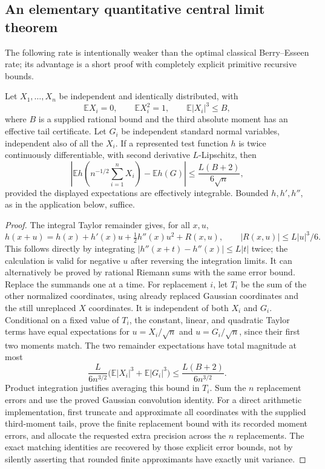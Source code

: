\subsection{An elementary quantitative central limit theorem}

The following rate is intentionally weaker than the optimal classical
Berry--Esseen rate; its advantage is a short proof with completely explicit
primitive recursive bounds.

Let $X_1,\ldots,X_n$ be independent and identically distributed, with
\[
 \mathbb E X_i=0,\qquad \mathbb E X_i^2=1,\qquad
 \mathbb E|X_i|^3\leq B,
\]
where $B$ is a supplied rational bound and the third absolute moment has
an effective tail certificate.  Let $G_i$ be independent standard normal
variables, independent also of all the $X_i$.  If a represented test
function $h$ is twice continuously differentiable, with second derivative
$L$-Lipschitz, then
\begin{equation}
 \left|\mathbb E h\!\left(n^{-1/2}\sum_{i=1}^nX_i\right)
               -\mathbb E h(G)\right|
 \leq\frac{L(B+2)}{6\sqrt n},
 \label{eq:smooth-clt}
\end{equation}
provided the displayed expectations are effectively integrable.  Bounded
$h,h',h''$, as in the application below, suffice.

\begin{proof}
The integral Taylor remainder gives, for all $x,u$,
\[
 h(x+u)=h(x)+h'(x)u+\tfrac12h''(x)u^2+R(x,u),\qquad
 |R(x,u)|\leq L|u|^3/6.
\]
This follows directly by integrating
$|h''(x+t)-h''(x)|\leq L|t|$ twice; the calculation is valid for negative
$u$ after reversing the integration limits.  It can alternatively be
proved by rational Riemann sums with the same error bound.
Replace the summands one at a time.  For replacement $i$, let $T_i$ be the
sum of the other normalized coordinates, using already replaced Gaussian
coordinates and the still unreplaced $X$ coordinates.  It is independent
of both $X_i$ and $G_i$.  Conditional on a fixed value of $T_i$, the constant,
linear, and quadratic Taylor terms have equal expectations for
$u=X_i/\sqrt n$ and $u=G_i/\sqrt n$, since their first two moments match.
The two remainder expectations have total magnitude at most
\[
 \frac{L}{6n^{3/2}}
      \bigl(\mathbb E|X_i|^3+\mathbb E|G_i|^3\bigr)
 \leq\frac{L(B+2)}{6n^{3/2}}.
\]
Product integration justifies averaging this bound in $T_i$.  Sum the $n$
replacement errors and use the proved Gaussian convolution identity.
For a direct arithmetic implementation, first truncate and approximate all
coordinates with the supplied third-moment tails, prove the finite
replacement bound with its recorded moment errors, and allocate the
requested extra precision across the $n$ replacements.  The exact matching
identities are recovered by those explicit error bounds, not by silently
asserting that rounded finite approximants have exactly unit variance.
\end{proof}


